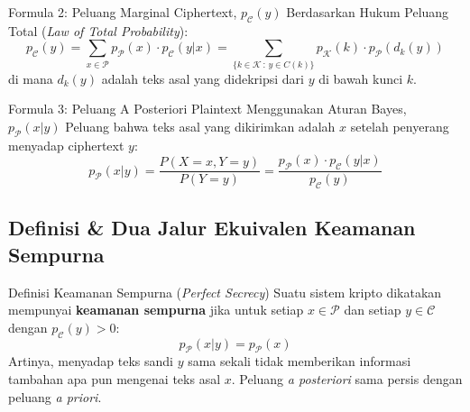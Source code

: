 \documentclass[11pt,a4paper]{article}
\begin{document}
\begin{tipsbox}{Formula 2: Peluang Marginal Ciphertext, $p_{\mathcal{C}}(y)$}
Berdasarkan Hukum Peluang Total (\textit{Law of Total Probability}):
\begin{equation}
\label{eq:py}
p_{\mathcal{C}}(y) = \sum_{x \in \mathcal{P}} p_{\mathcal{P}}(x) \cdot p_{\mathcal{C}}(y|x) = \sum_{\{k \in \mathcal{K} \,:\, y \in C(k)\}} p_{\mathcal{K}}(k) \cdot p_{\mathcal{P}}(d_k(y))
\end{equation}
di mana $d_k(y)$ adalah teks asal yang didekripsi dari $y$ di bawah kunci $k$.
\end{tipsbox}

\begin{tipsbox}{Formula 3: Peluang A Posteriori Plaintext Menggunakan Aturan Bayes, $p_{\mathcal{P}}(x|y)$}
Peluang bahwa teks asal yang dikirimkan adalah $x$ setelah penyerang menyadap ciphertext $y$:
\begin{equation}
\label{eq:pxy}
p_{\mathcal{P}}(x|y) = \frac{P(X = x, Y = y)}{P(Y = y)} = \frac{p_{\mathcal{P}}(x) \cdot p_{\mathcal{C}}(y|x)}{p_{\mathcal{C}}(y)}
\end{equation}
\end{tipsbox}

\subsection{Definisi \& Dua Jalur Ekuivalen Keamanan Sempurna}

\begin{soalbox}{Definisi Keamanan Sempurna (\textit{Perfect Secrecy})}
Suatu sistem kripto dikatakan mempunyai \textbf{keamanan sempurna} jika untuk setiap $x \in \mathcal{P}$ dan setiap $y \in \mathcal{C}$ dengan $p_{\mathcal{C}}(y) > 0$:
\begin{equation}
\label{eq:def_ps}
p_{\mathcal{P}}(x|y) = p_{\mathcal{P}}(x)
\end{equation}
Artinya, menyadap teks sandi $y$ sama sekali tidak memberikan informasi tambahan apa pun mengenai teks asal $x$. Peluang \textit{a posteriori} sama persis dengan peluang \textit{a priori}.
\end{soalbox}
\end{document}
